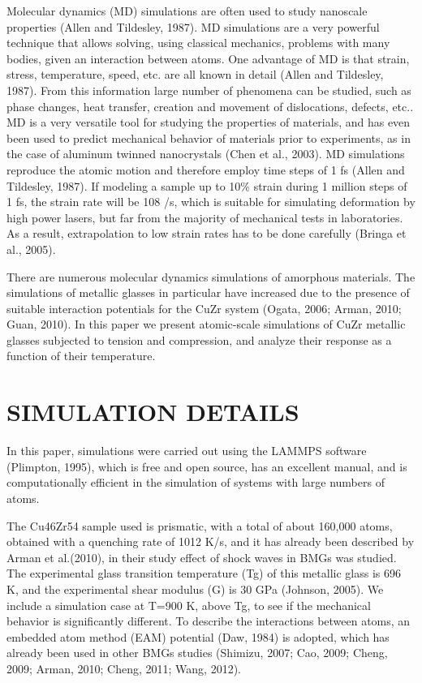 Molecular dynamics (MD) simulations are often used to study nanoscale properties (Allen and Tildesley, 1987). MD simulations are a very powerful technique that allows solving, using classical mechanics, problems with many bodies, given an interaction between atoms. One advantage of MD is that strain, stress, temperature, speed, etc. are all known in detail (Allen and Tildesley, 1987). From this information large number of phenomena can be studied, such as phase changes, heat transfer, creation and movement of dislocations, defects, etc.. MD is a very versatile tool for studying the properties of materials, and has even been used to predict mechanical behavior of materials prior to  experiments, as in the case of aluminum twinned nanocrystals (Chen et al., 2003). MD simulations reproduce the atomic motion and therefore employ time steps of 1 fs (Allen and Tildesley, 1987). If modeling a sample up to 10\% strain during 1 million steps of 1 fs, the strain rate will be 108 /s, which is suitable for simulating deformation by high power lasers, but far from the majority of mechanical tests in laboratories. As a result, extrapolation to low strain rates has to be done carefully (Bringa et al., 2005).

There are numerous molecular dynamics simulations of amorphous materials. The simulations of metallic glasses in particular have increased due to the presence of suitable interaction potentials for the CuZr system (Ogata, 2006; Arman, 2010; Guan, 2010). In this paper we present atomic-scale simulations of CuZr metallic glasses subjected to tension and compression, and analyze their response as a function of their temperature.

\section{SIMULATION DETAILS}
In this paper, simulations were carried out using the LAMMPS software (Plimpton, 1995), which is free and open source, has an excellent manual, and is computationally efficient in the simulation of systems with large numbers of atoms.

The Cu46Zr54 sample used is prismatic, with a total of about 160,000 atoms, obtained with a quenching rate of 1012 K/s, and it has already been described by Arman et al.(2010), in their study effect of shock waves in BMGs was studied. The experimental glass transition temperature (Tg) of this metallic glass is 696 K, and the experimental shear modulus (G) is 30 GPa (Johnson, 2005). We include a simulation case at T=900 K, above Tg, to see if the mechanical behavior is significantly different. To describe the interactions between atoms, an embedded atom method (EAM) potential (Daw, 1984) is adopted, which has already been used in other BMGs studies (Shimizu, 2007; Cao, 2009; Cheng, 2009; Arman, 2010; Cheng, 2011; Wang, 2012).

